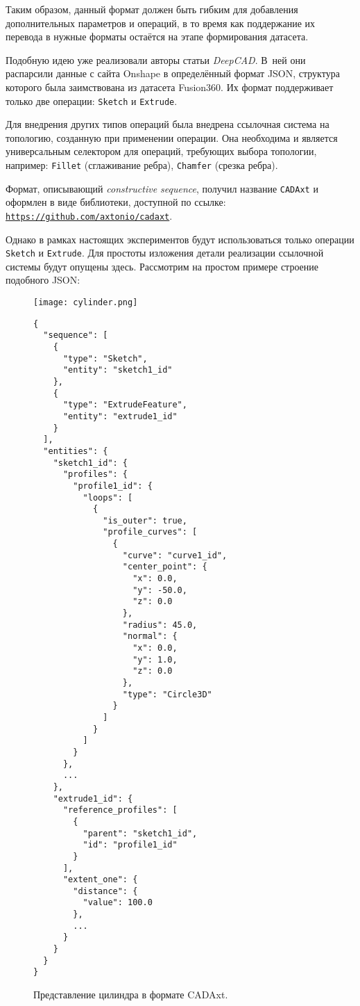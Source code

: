Таким образом, данный формат должен быть гибким для добавления дополнительных параметров и операций,
в то время как поддержание их перевода в нужные форматы остаётся на этапе формирования датасета.

Подобную идею уже реализовали авторы статьи \textit{DeepCAD}. В~ней они распарсили данные с сайта Onshape в определённый формат JSON,
структура которого была заимствована из датасета Fusion360.
Их формат поддерживает только две операции: \texttt{Sketch} и \texttt{Extrude}.

Для внедрения других типов операций была внедрена ссылочная система на топологию, созданную при применении операции.
Она необходима и является универсальным селектором для операций, требующих выбора топологии, например: \texttt{Fillet} (сглаживание ребра), \texttt{Chamfer} (срезка ребра).

Формат, описывающий \textit{constructive sequence}, получил название \texttt{CADAxt}
и оформлен в виде библиотеки, доступной по ссылке: \href{https://github.com/axtonio/cadaxt}{\texttt{https://github.com/axtonio/cadaxt}}.

Однако в рамках настоящих экспериментов будут использоваться только операции \texttt{Sketch} и \texttt{Extrude}.
Для простоты изложения детали реализации ссылочной системы будут опущены здесь.
Рассмотрим на простом примере строение подобного JSON:

\begin{figure}[]
    \centering
    \begin{minipage}[]{0.4\textwidth}
        \centering
        \texttt{[image: cylinder.png]}
    \end{minipage}
    \hfill
    \begin{minipage}[]{0.5\textwidth}
        \centering
        \footnotesize
        \begin{verbatim}
{
  "sequence": [
    {
      "type": "Sketch",
      "entity": "sketch1_id"
    },
    {
      "type": "ExtrudeFeature",
      "entity": "extrude1_id"
    }
  ],
  "entities": {
    "sketch1_id": {
      "profiles": {
        "profile1_id": {
          "loops": [
            {
              "is_outer": true,
              "profile_curves": [
                {
                  "curve": "curve1_id",
                  "center_point": {
                    "x": 0.0,
                    "y": -50.0,
                    "z": 0.0
                  },
                  "radius": 45.0,
                  "normal": {
                    "x": 0.0,
                    "y": 1.0,
                    "z": 0.0
                  },
                  "type": "Circle3D"
                }
              ]
            }
          ]
        }
      },
      ...
    },
    "extrude1_id": {
      "reference_profiles": [
        {
          "parent": "sketch1_id",
          "id": "profile1_id"
        }
      ],
      "extent_one": {
        "distance": {
          "value": 100.0
        },
        ...
      }
    }
  }
}
\end{verbatim}
    \end{minipage}
    \caption{Представление цилиндра в формате CADAxt.}
\end{figure}

